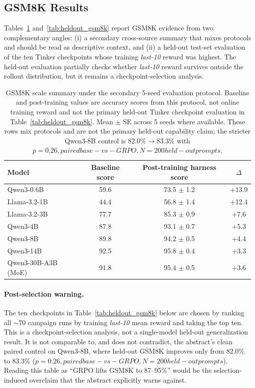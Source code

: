 \subsection{GSM8K Results}
\label{sec:gsm8k_results}

Tables~\ref{tab:results_gsm8k} and~\ref{tab:heldout_gsm8k} report GSM8K
evidence from two complementary angles: (i) a secondary cross-source summary
that mixes protocols and should be read as descriptive context, and (ii) a
held-out test-set evaluation of the
ten Tinker checkpoints whose training \emph{last-10} reward was highest.
The held-out evaluation partially checks whether \emph{last-10} reward survives
outside the rollout distribution, but it remains a checkpoint-selection analysis.

\begin{table}[htbp]
\centering
\caption{GSM8K scale summary under the secondary 5-seed evaluation protocol. Baseline and post-training values are accuracy scores from this protocol, not online training reward and not the primary held-out Tinker checkpoint evaluation in Table~\ref{tab:heldout_gsm8k}. Mean $\pm$ SE across 5 seeds where available. These rows mix protocols and are not the primary held-out capability claim; the stricter Qwen3-8B control is $82.0\%\!\to\!83.3\%$ with $p=0.26, paired base-vs-GRPO, N=200 held-out prompts $.}
\label{tab:results_gsm8k}
\begin{tabular}{lccc}
\toprule
\textbf{Model} & \textbf{Baseline score} & \textbf{Post-training harness score} & \textbf{$\Delta$} \\
\midrule
Qwen3-0.6B & 59.6 & 73.5 $\pm$ 1.2 & +13.9 \\
Llama-3.2-1B & 44.4 & 56.8 $\pm$ 1.4 & +12.4 \\
Llama-3.2-3B & 77.7 & 85.3 $\pm$ 0.9 & +7.6 \\
Qwen3-4B & 87.8 & 93.1 $\pm$ 0.7 & +5.3 \\
Qwen3-8B & 89.8 & 94.2 $\pm$ 0.5 & +4.4 \\
Qwen3-14B & 92.5 & 95.8 $\pm$ 0.4 & +3.3 \\
Qwen3-30B-A3B (MoE) & 91.8 & 95.4 $\pm$ 0.5 & +3.6 \\
\bottomrule
\end{tabular}
\end{table}

\paragraph{Post-selection warning.}
The ten checkpoints in Table~\ref{tab:heldout_gsm8k} below are chosen by
ranking all $\sim$70 campaign runs by training \emph{last-10} mean reward and
taking the top ten.  This is a checkpoint-selection analysis, not a
single-model held-out generalization result.  It is not comparable to, and
does not contradict, the abstract's clean paired control on Qwen3-8B, where
held-out GSM8K improves only from $82.0\%$ to $83.3\%$ ($p=0.26, paired base-vs-GRPO, N=200 held-out prompts $).  Reading
this table as ``GRPO lifts GSM8K to 87--95\%'' would be the selection-induced
overclaim that the abstract explicitly warns against.


